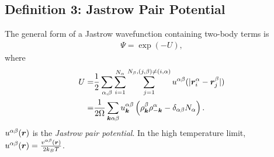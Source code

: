 \subsection{Definition 3: Jastrow Pair Potential}
The general form of a Jastrow wavefunction containing two-body terms is
\begin{align}
\Psi = \exp\left(-U\right),
\end{align}
where
\begin{align}
U =& \frac{1}{2}\sum\limits_{\alpha, \beta} \sum\limits_{i=1}^{N_\alpha} \sum\limits_{j=1}^{N_\beta, (j,\beta)\neq(i,\alpha)} 
u^{\alpha\beta}(\vert\boldsymbol{r}_i^\alpha - \boldsymbol{r}_j^\beta \vert) \nonumber \\
=& \frac{1}{2\Omega} \sum\limits_{\boldsymbol{k}\alpha\beta}
u^{\alpha\beta}_{\boldsymbol{k}} \left( \rho^\beta_{\boldsymbol{k}}\rho^\alpha_{-\boldsymbol{k}}-\delta_{\alpha\beta}N_\alpha \right).
\end{align}
$u^{\alpha\beta}(\boldsymbol{r})$ is the \emph{Jastrow pair potential}. In the high temperature limit, $u^{\alpha\beta}(\boldsymbol{r})=\frac{v^{\alpha\beta}(\boldsymbol{r})}{2k_BT}$.